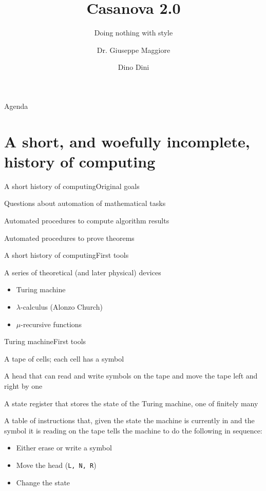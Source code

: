 \documentclass{beamer}
\title{Casanova 2.0}
\subtitle{Doing nothing with style}
\author{Dr. Giuseppe Maggiore \and Dino Dini}
\institute{NHTV University of Applied Sciences \\ 
Breda, Netherlands}
\date{}
\begin{document}
\maketitle

\begin{frame}{Agenda}
\tableofcontents
\end{frame}

\section{A short, and woefully incomplete, history of computing}
\begin{slide}{A short history of computing}{Original goals}{
\item Questions about automation of mathematical tasks
\item Automated procedures to compute algorithm results
\item Automated procedures to prove theorems
}\end{slide}

\begin{slide}{A short history of computing}{First tools}{
\item A series of theoretical (and later physical) devices
\begin{itemize}
\item Turing machine \cite{TURING_MACHINE}
\item $\lambda$-calculus (Alonzo Church) \cite{LAMBDA_CALCULUS}
\item $\mu$-recursive functions \cite{MU_RECURSION}
\end{itemize}
}\end{slide}

\begin{slide}{Turing machine}{First tools}{
\item A tape of cells; each cell has a symbol
\item A head that can read and write symbols on the tape and move the tape left and right by one
\item A state register that stores the state of the Turing machine, one of finitely many
\item A table of instructions that, given the state the machine is currently in and the symbol it is reading on the tape tells the machine to do the following in sequence:
\begin{itemize}
\item Either erase or write a symbol
\item Move the head (\texttt{L, N, R})
\item Change the state
\end{itemize}
}\end{slide}
\end{document}
